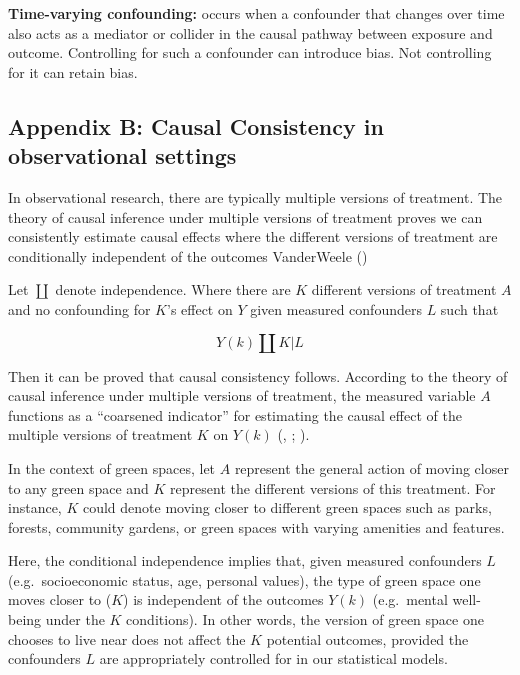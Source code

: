 \documentclass[
  singlecolumn]{article}
\begin{document}
\textbf{Time-varying confounding:} occurs when a confounder that changes
over time also acts as a mediator or collider in the causal pathway
between exposure and outcome. Controlling for such a confounder can
introduce bias. Not controlling for it can retain bias.

\newpage{}

\subsection{Appendix B: Causal Consistency in observational
settings}\label{appendix-b}

In observational research, there are typically multiple versions of
treatment. The theory of causal inference under multiple versions of
treatment proves we can consistently estimate causal effects where the
different versions of treatment are conditionally independent of the
outcomes VanderWeele ()

Let \(\coprod\) denote independence. Where there are \(K\) different
versions of treatment \(A\) and no confounding for \(K\)'s effect on
\(Y\) given measured confounders \(L\) such that

\[
Y(k) \coprod K | L
\]

Then it can be proved that causal consistency follows. According to the
theory of causal inference under multiple versions of treatment, the
measured variable \(A\) functions as a ``coarsened indicator'' for
estimating the causal effect of the multiple versions of treatment \(K\)
on \(Y(k)\) (,
;
).

In the context of green spaces, let \(A\) represent the general action
of moving closer to any green space and \(K\) represent the different
versions of this treatment. For instance, \(K\) could denote moving
closer to different green spaces such as parks, forests, community
gardens, or green spaces with varying amenities and features.

Here, the conditional independence implies that, given measured
confounders \(L\) (e.g.~socioeconomic status, age, personal values), the
type of green space one moves closer to (\(K\)) is independent of the
outcomes \(Y(k)\) (e.g.~mental well-being under the \(K\) conditions).
In other words, the version of green space one chooses to live near does
not affect the \(K\) potential outcomes, provided the confounders \(L\)
are appropriately controlled for in our statistical models.
\end{document}
